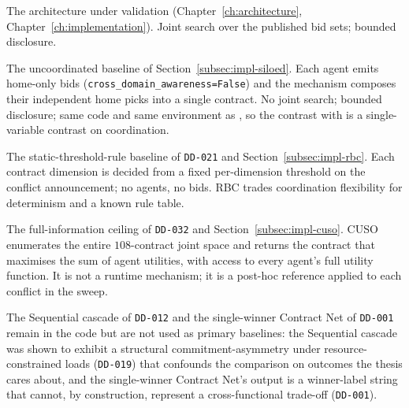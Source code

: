 \begin{description}[leftmargin=2.4em,style=nextline,itemsep=0.25em]
  \item[\NEXUS{}.] The architecture under validation
    (Chapter~\ref{ch:architecture}, Chapter~\ref{ch:implementation}).
    Joint search over the published bid sets; bounded disclosure.
  \item[Siloed-v5.] The uncoordinated baseline of
    Section~\ref{subsec:impl-siloed}. Each agent emits home-only bids
    (\texttt{cross\_domain\_awareness=False}) and the mechanism
    composes their independent home picks into a single contract.
    No joint search; bounded disclosure; same code and same
    environment as \NEXUS{}, so the contrast with \NEXUS{} is a
    single-variable contrast on coordination.
  \item[RBC --- Rule-Based Coordination.] The
    static-threshold-rule baseline of \texttt{DD-021} and
    Section~\ref{subsec:impl-rbc}. Each contract dimension is
    decided from a fixed per-dimension threshold on the conflict
    announcement; no agents, no bids. RBC trades coordination
    flexibility for determinism and a known rule table.
  \item[CUSO --- Centralised Utility-Sum Optimiser.] The
    full-information ceiling of \texttt{DD-032} and
    Section~\ref{subsec:impl-cuso}. CUSO enumerates the entire
    $108$-contract joint space and returns the contract that
    maximises the sum of agent utilities, with access to every
    agent's full utility function. It is not a runtime mechanism;
    it is a post-hoc reference applied to each conflict in the
    sweep.
\end{description}

The Sequential cascade of \texttt{DD-012} and the single-winner
Contract Net of \texttt{DD-001} remain in the code but are not used
as primary baselines: the Sequential cascade was shown to exhibit a
structural commitment-asymmetry under resource-constrained loads
(\texttt{DD-019}) that confounds the comparison on outcomes the
thesis cares about, and the single-winner Contract Net's output is a
winner-label string that cannot, by construction, represent a
cross-functional trade-off (\texttt{DD-001}).

